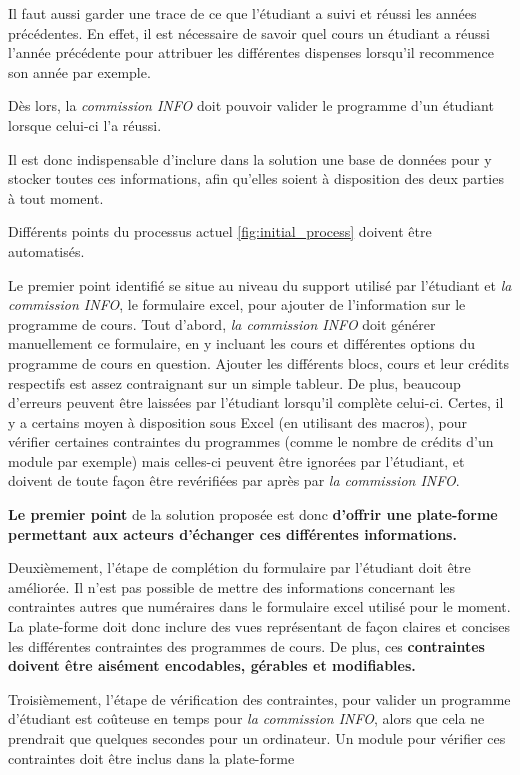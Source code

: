 Il faut aussi garder une trace de ce que l'étudiant a suivi et réussi les années précédentes. En effet, il est nécessaire de savoir quel cours un étudiant a réussi l'année précédente pour attribuer les différentes dispenses lorsqu'il recommence son année par exemple.

Dès lors, la \textit{commission INFO} doit pouvoir valider le programme d'un étudiant lorsque celui-ci l'a réussi. 

Il est donc indispensable d'inclure dans la solution une base de données pour y stocker toutes ces informations, afin qu'elles soient à disposition des deux parties à tout moment.

Différents points du processus actuel \ref{fig:initial_process} doivent être automatisés.

Le premier point identifié se situe au niveau du support utilisé par l'étudiant et \textit{la commission INFO}, le formulaire excel, pour ajouter de l'information sur le programme de cours. Tout d'abord, \textit{la commission INFO} doit générer manuellement ce formulaire, en y incluant les cours et différentes options du programme de cours en question. Ajouter les différents blocs, cours et leur crédits respectifs est assez contraignant sur un simple tableur. De plus, beaucoup d'erreurs peuvent être laissées par l'étudiant lorsqu'il complète celui-ci. Certes, il y a certains moyen à disposition sous Excel (en utilisant des macros), pour vérifier certaines contraintes du programmes (comme le nombre de crédits d'un module par exemple) mais celles-ci peuvent être ignorées par l'étudiant, et doivent de toute façon être revérifiées par après par \textit{la commission INFO}. 

\textbf{Le premier point} de la solution proposée est donc  \textbf{d’offrir une plate-forme permettant aux acteurs d'échanger ces différentes informations.}

Deuxièmement, l'étape de complétion du formulaire par l'étudiant doit être améliorée. Il n'est pas possible de mettre des informations concernant les contraintes autres que numéraires dans le formulaire excel utilisé pour le moment. La plate-forme doit donc inclure des vues représentant de façon claires et concises les différentes contraintes des programmes de cours. De plus, ces \textbf{contraintes doivent être aisément encodables, gérables et modifiables.} 

Troisièmement, l'étape de vérification des contraintes, pour valider un programme d'étudiant est coûteuse en temps pour \textit{la commission INFO}, alors que cela ne prendrait que quelques secondes pour un ordinateur. Un module pour vérifier ces contraintes doit être inclus dans la plate-forme

